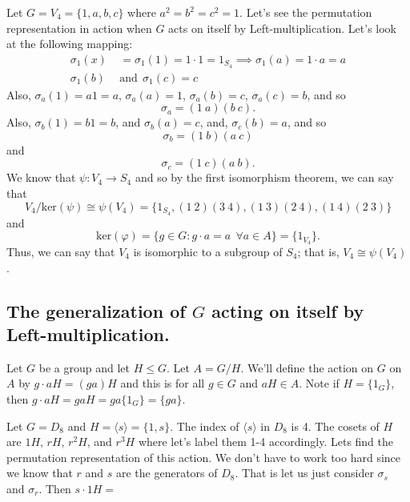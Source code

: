 \begin{eg}
   Let \( G = {V}_{4} = \{  1,a,b,c \}  \) where \( a^{2} = b^{2} = c^{2} = 1  \). Let's see the permutation representation in action when \( G  \) acts on itself by Left-multiplication. Let's look at the following mapping:
   \begin{align*}
       {\sigma}_{1}(x) &= {\sigma}_{1}(1) = 1 \cdot 1 = {1}_{{S}_{4}} \implies {\sigma}_{1}(a) = 1 \cdot a = a    \\
       {\sigma}_{1}(b) \ \ &\text{and} \ \  {\sigma}_{1}(c) = c 
   \end{align*}
   Also, \( {\sigma}_{a}(1) = a 1  =a  \), \( {\sigma}_{a}(a) = 1  \), \( {\sigma}_{a}(b) = c  \), \( {\sigma}_{a}(c) = b  \), and so 
   \[  {\sigma}_{a} = (1 \ a )(b \ c). \]
   Also, \( {\sigma}_{b}(1) = b1 = b  \), and \( {\sigma}_{b}(a) = c   \), and, \( {\sigma}_{c}(b) = a  \), and so   
   \[  {\sigma}_{b} = (1 \ b)(a \ c) \]
   and 
   \[  {\sigma}_{c} = (1 \ c)(a \ b). \]
   We know that \( \psi : {V}_{4} \to {S}_{4} \) and so by the first isomorphism theorem, we can say that 
   \[  {V}_{4} / \text{ker}(\psi) \cong \psi({V}_{4}) = \{ {1}_{{S}_{4}} , (1 \ 2)(3 \ 4), (1 \ 3)(2 \ 4), (1 \ 4)(2 \ 3) \}  \]
   and
   \[ \text{ker}(\varphi) = \{ g \in G : g \cdot a  = a \ \   \forall a \in A   \} = \{ {1}_{{V}_{4}} \}.    \]
   Thus, we can say that \( {V}_{4} \) is isomorphic to a subgroup of \( {S}_{4} \); that is, \( {V}_{4} \cong \psi({V}_{4}) \).
\end{eg}
\subsection{The generalization of \( G  \) acting on itself by Left-multiplication.}

 Let \( G  \) be a group and let \(  H \leq G  \). Let \( A = G / H  \). We'll define the action on \( G  \) on \( A  \) by \( g \cdot aH  = (ga)H \) and this is for all \(  g \in G  \) and \( a H \in A  \).
 Note if \( H = \{ {1}_{G} \}  \), then \( g \cdot aH = ga H  = ga \{ {1}_{G} \}  = \{ ga \}  \).

 \begin{eg}
    Let \( G = {D}_{8} \) and \( H = \langle s  \rangle = \{  1,s \}   \). The index of \( \langle s  \rangle \) in \( {D}_{8} \) is 4. The cosets of \( H  \) are \( 1 H  \), \( r H  \), \( r^{2} H  \), and \( r^{3} H  \) where let's label them 1-4 accordingly. Lets find the permutation representation of this action. We don't have to work too hard since we know that \( r  \) and \( s  \) are the generators of \( {D}_{8} \). That is let us just consider \( {\sigma}_{s} \) and \( {\sigma}_{r} \). Then \( s \cdot 1 H = \)   
 \end{eg}


 
